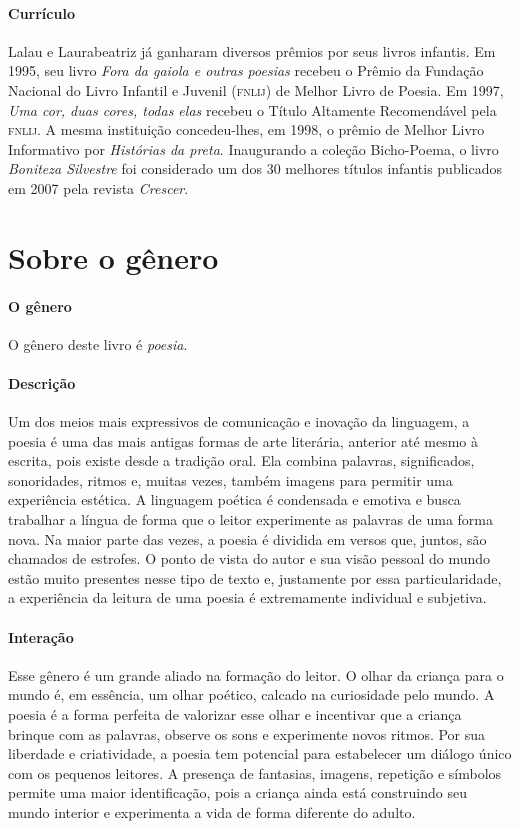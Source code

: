 \documentclass[11pt]{extarticle}
\begin{document}
\paragraph{Currículo} Lalau e Laurabeatriz já ganharam diversos prêmios por seus livros infantis. Em 1995, seu livro \textit{Fora da gaiola e outras poesias} recebeu o Prêmio da Fundação Nacional do Livro Infantil e Juvenil (\textsc{fnlij}) de Melhor Livro de Poesia. Em 1997, \textit{Uma cor, duas cores, todas elas} recebeu o Título Altamente Recomendável pela \textsc{fnlij}. A mesma instituição concedeu-lhes, em 1998, o prêmio de Melhor Livro Informativo por \textit{Histórias da preta}. Inaugurando a coleção Bicho-Poema, o livro \textit{Boniteza Silvestre} foi considerado um dos 30 melhores títulos infantis publicados em 2007 pela revista \textit{Crescer}. 

\section{Sobre o gênero}

\paragraph{O gênero} O gênero deste livro é \textit{poesia}. 


\paragraph{Descrição} Um dos meios mais expressivos de comunicação e inovação da linguagem, a poesia é uma das mais antigas formas de arte literária, anterior até mesmo à escrita, pois existe desde a tradição oral. Ela combina palavras, significados, sonoridades, ritmos e, muitas vezes, também imagens para permitir uma experiência estética. A linguagem poética é condensada e emotiva e busca trabalhar a língua de forma que o leitor experimente as palavras de uma forma nova. Na maior parte das vezes, a poesia é dividida em versos que, juntos, são chamados de estrofes. O ponto de vista do autor e sua visão pessoal do mundo estão muito presentes nesse tipo de texto e, justamente por essa particularidade, a experiência da leitura de uma poesia é extremamente individual e subjetiva.

\paragraph{Interação} Esse gênero é um grande aliado na formação do leitor. O olhar da criança para o mundo é, em essência, um olhar poético, calcado na curiosidade pelo mundo. A poesia é a forma perfeita de valorizar esse olhar e incentivar que a criança brinque com as palavras, observe os sons e experimente novos ritmos. Por sua liberdade e criatividade, a poesia tem potencial para estabelecer um diálogo único com os pequenos leitores. A presença de fantasias, imagens, repetição e símbolos permite uma maior identificação, pois a criança ainda está construindo seu mundo interior e experimenta a vida de forma diferente do adulto. 
\end{document}
